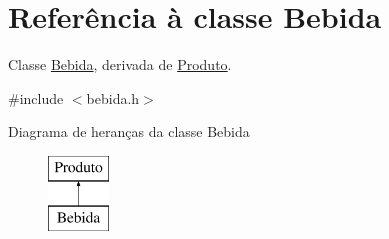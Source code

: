 \hypertarget{classBebida}{\section{Referência à classe Bebida}
\label{classBebida}
}


Classe \hyperlink{classBebida}{Bebida}, derivada de \hyperlink{classProduto}{Produto}.  




{\ttfamily \#include $<$bebida.\-h$>$}

Diagrama de heranças da classe Bebida\begin{figure}[H]
\begin{center}
\leavevmode
\includegraphics[height=2.000000cm]{df/de2/classBebida}
\end{center}
\end{figure}
